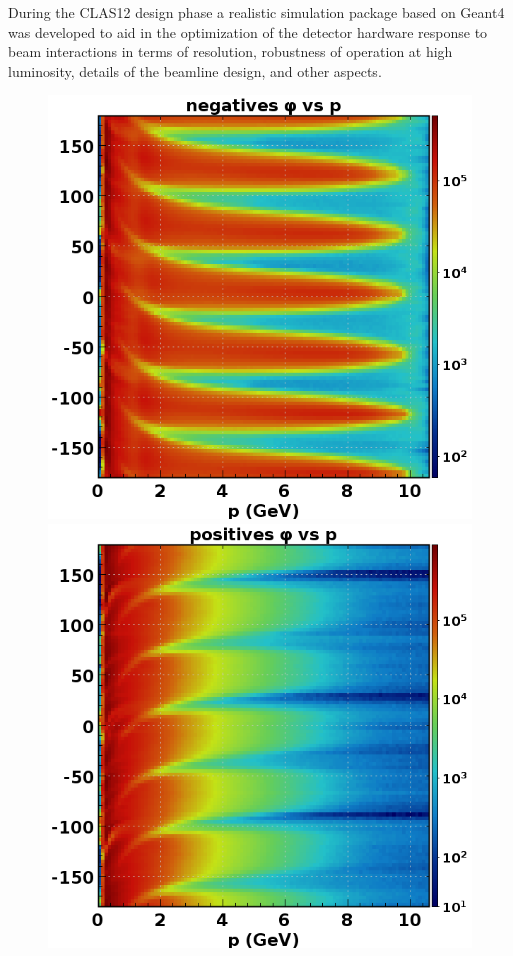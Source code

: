 \documentclass[final,3p,twocolumn]{elsarticle}
\begin{document}
During the CLAS12 design phase a realistic simulation package based on Geant4 was developed to aid in the
optimization of the detector hardware response to beam interactions in terms of resolution, robustness of operation
at high luminosity, details of the beamline design, and other aspects. 

\begin{figure}[t!]
\centerline{\includegraphics[width=0.95\columnwidth]{neg_phi_p.png}
\hspace{1cm}\includegraphics[width=0.95\columnwidth]{pos_phi_p.png}}

\end{figure}
\end{document}
